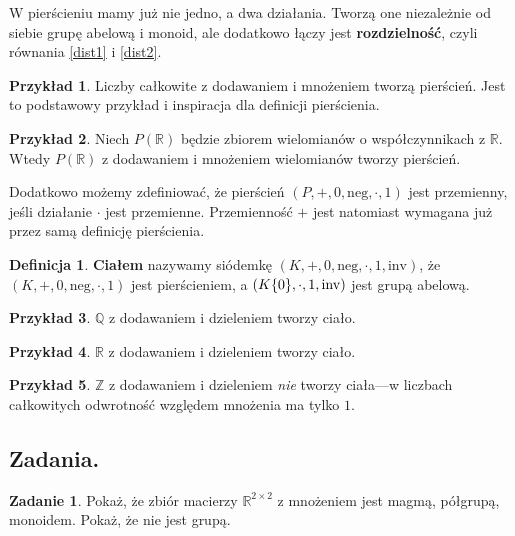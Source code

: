 \documentclass{article}
\theoremstyle{definition}
\newtheorem{definition}{Definicja}[section]
\newtheorem{example}{Przykład}[section]
\newtheorem{exercise}{Zadanie}[section]
\begin{document}
W pierścieniu mamy już nie jedno,
	a dwa działania.
Tworzą one niezależnie od siebie grupę abelową i monoid,
	ale dodatkowo łączy jest \textbf{rozdzielność},
	czyli równania \eqref{dist1} i \eqref{dist2}.

\begin{example}
	Liczby całkowite z dodawaniem i mnożeniem tworzą pierścień.
	Jest to podstawowy przykład i inspiracja dla definicji pierścienia.
\end{example}

\begin{example}
	Niech $P(\mathbb{R})$ będzie zbiorem wielomianów o współczynnikach z $\mathbb{R}$.
	Wtedy $P(\mathbb{R})$ z dodawaniem i mnożeniem wielomianów tworzy pierścień.
\end{example}

Dodatkowo możemy zdefiniować,
	że pierścień $(P, +, 0, \mathrm{neg}, \cdot, 1)$ jest przemienny,
	jeśli działanie $\cdot$ jest przemienne.
Przemienność $+$ jest natomiast wymagana już przez samą definicję pierścienia.

\begin{definition}
	\textbf{Ciałem} nazywamy siódemkę $(K, +, 0, \mathrm{neg}, \cdot, 1, \mathrm{inv})$,
		że $(K, +, 0, \mathrm{neg}, \cdot, 1)$ jest pierścieniem,
		a $(K \\ \{0\}, \cdot, 1, \mathrm{inv})$ jest grupą abelową.
\end{definition}

\begin{example}
	$\mathbb{Q}$ z dodawaniem i dzieleniem tworzy ciało.
\end{example}

\begin{example}
	$\mathbb{R}$ z dodawaniem i dzieleniem tworzy ciało.
\end{example}

\begin{example}
	$\mathbb{Z}$ z dodawaniem i dzieleniem \textit{nie} tworzy ciała---w liczbach całkowitych
		odwrotność względem mnożenia ma tylko $1$.
\end{example}

\subsection{Zadania.}

\begin{exercise}
	Pokaż, że zbiór macierzy $\mathbb{R}^{2 \times 2}$ z mnożeniem
		jest magmą, półgrupą, monoidem.
	Pokaż, że nie jest grupą.
\end{exercise}
\end{document}
